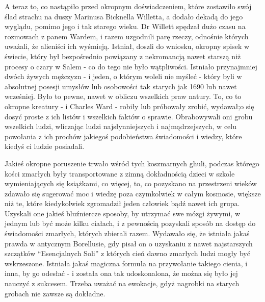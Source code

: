A teraz to, co nastąpiło przed okropnym doświadczeniem, które zostawiło swój ślad strachu na duszy Marinusa Bicknella Willetta, a dodało dekadą do jego wyglądu, pomimo jego i tak starego wieku. Dr Willett spędzał dużo czasu na rozmowach z panem Wardem, i razem uzgodnili parę rzeczy, odnośnie których uważali, że alieniści ich wyśmieją. Istniał, doszli do wniosku, okropny spisek w świecie, który był bezpośrednio powiązany z nekromancją nawet starszą niż procesy o czary w Salem - co do tego nie było wątpliwości. Istniało przynajmniej dwóch żywych mężczyzn - i jeden, o którym woleli nie myśleć - który byli w absolutnej posesji umysłów lub osobowości tak starych jak 1690 lub nawet wcześniej. Było to pewne, nawet w obliczu wszelkich praw natury. To, co to okropne kreatury - i Charles Ward - robiły lub próbowały zrobić, wydawał;o się dosyć proste z ich listów i wszelkich faktów o sprawie. Obrabowywali oni grobu wszelkich ludzi, wliczając ludzi najsłynniejszych i najmądrzejszych, w celu powołania z ich prochów jakiegoś podobieństwa świadomości i wiedzy, które kiedyś ci ludzie posiadali. 

Jakieś okropne poruszenie trwało wśród tych koszmarnych ghuli, podczas którego kości zmarłych były transportowane z zimną dokładnością dzieci w szkole wymieniających się książkami, co więcej, to, co pozyskano na przestrzeni wieków zdawało się sugerować moc i wiedzę poza czymkolwiek w całym kosmosie, większe niż te, które kiedykolwiek zgromadził jeden człowiek bądź nawet ich grupa.  Uzyskali one jakieś bluźniercze sposoby, by utrzymać swe mózgi żywymi, w jednym lub być może kilku ciałach, i z pewnością pozyskali sposób na dostęp do świadomości zmarłych, których zbierali razem. Wydawało się, że istniała jakaś prawda w antycznym Borellusie, gdy pisał on o uzyskaniu z nawet najstarszych szczątków ``Esencjalnych Soli'' z których cień dawno zmarłych ludzi mogły być wskrzeszone. Istniała jakaś magiczna formuła na przywołanie takiego cienia, i inna, by go odesłać - i została ona tak udoskonalona, że można się było jej nauczyć z sukcesem. Trzeba uważać na ewokacje, gdyż nagrobki na starych grobach nie zawsze są dokładne. 

